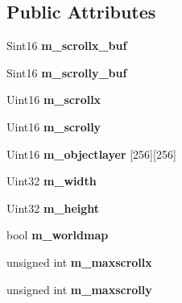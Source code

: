 \subsection*{Public Attributes}
\begin{DoxyCompactItemize}
\item 
\hypertarget{class_c_map_ac04f23075a442a20953f04d84ce7faa5}{
Sint16 {\bfseries m\_\-scrollx\_\-buf}}
\label{class_c_map_ac04f23075a442a20953f04d84ce7faa5}

\item 
\hypertarget{class_c_map_a4c13a8b7f1d34af4c2c6ab15d8368602}{
Sint16 {\bfseries m\_\-scrolly\_\-buf}}
\label{class_c_map_a4c13a8b7f1d34af4c2c6ab15d8368602}

\item 
\hypertarget{class_c_map_a8e1e73012be84e7a1d99c6bb27e44d3b}{
Uint16 {\bfseries m\_\-scrollx}}
\label{class_c_map_a8e1e73012be84e7a1d99c6bb27e44d3b}

\item 
\hypertarget{class_c_map_a82a879179180648c4466d4811dcde0d8}{
Uint16 {\bfseries m\_\-scrolly}}
\label{class_c_map_a82a879179180648c4466d4811dcde0d8}

\item 
\hypertarget{class_c_map_a103bc009069478f76de9e58530b7b8fd}{
Uint16 {\bfseries m\_\-objectlayer} \mbox{[}256\mbox{]}\mbox{[}256\mbox{]}}
\label{class_c_map_a103bc009069478f76de9e58530b7b8fd}

\item 
\hypertarget{class_c_map_ab41c87f8f7b5542c30a51efae0ee88ac}{
Uint32 {\bfseries m\_\-width}}
\label{class_c_map_ab41c87f8f7b5542c30a51efae0ee88ac}

\item 
\hypertarget{class_c_map_af1c79858c90e57b259741c946a03a9ec}{
Uint32 {\bfseries m\_\-height}}
\label{class_c_map_af1c79858c90e57b259741c946a03a9ec}

\item 
\hypertarget{class_c_map_ada3c5b0e48ed3b72891cb02545ca8d26}{
bool {\bfseries m\_\-worldmap}}
\label{class_c_map_ada3c5b0e48ed3b72891cb02545ca8d26}

\item 
\hypertarget{class_c_map_a924108770dbc199df7be4e3dd1f7b607}{
unsigned int {\bfseries m\_\-maxscrollx}}
\label{class_c_map_a924108770dbc199df7be4e3dd1f7b607}

\item 
\hypertarget{class_c_map_aeed8c6aee8ba7aab85ef8b0c51b025b1}{
unsigned int {\bfseries m\_\-maxscrolly}}
\label{class_c_map_aeed8c6aee8ba7aab85ef8b0c51b025b1}


\end{DoxyCompactItemize}
